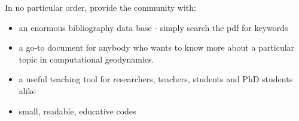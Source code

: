 
In no particular order, provide the community with:
\begin{itemize}
\item an enormous bibliography data base - simply search the pdf for keywords
\item a go-to document for anybody who wants to know more about 
      a particular topic in computational geodynamics.
\item a useful teaching tool for researchers, teachers, students and PhD students alike 
\item small, readable, educative codes 
\end{itemize}

